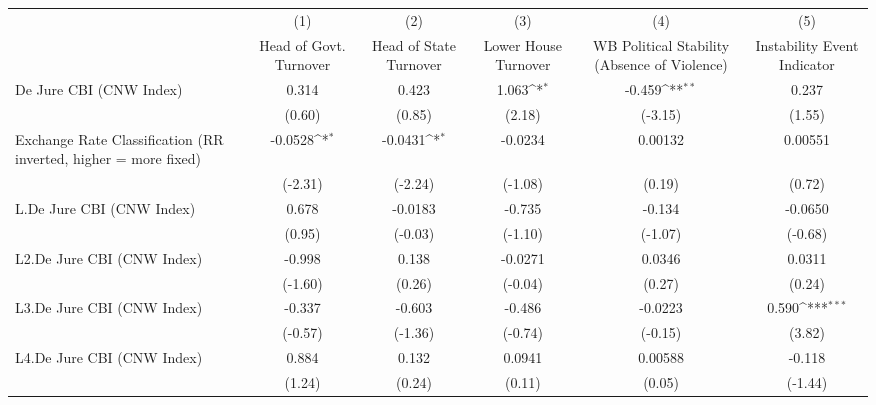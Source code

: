 {
\def\sym#1{\ifmmode^{#1}\else\(^{#1}\)\fi}
\begin{longtable}{l*{5}{c}}
\toprule\endfirsthead\midrule\endhead\midrule\endfoot\endlastfoot
                &\multicolumn{1}{c}{(1)}&\multicolumn{1}{c}{(2)}&\multicolumn{1}{c}{(3)}&\multicolumn{1}{c}{(4)}&\multicolumn{1}{c}{(5)}\\
                &\multicolumn{1}{c}{Head of Govt. Turnover}&\multicolumn{1}{c}{Head of State Turnover}&\multicolumn{1}{c}{Lower House Turnover}&\multicolumn{1}{c}{WB Political Stability (Absence of Violence)}&\multicolumn{1}{c}{Instability Event Indicator}\\
\midrule
De Jure CBI (CNW Index)&    0.314         &    0.423         &    1.063\sym{*}  &   -0.459\sym{**} &    0.237         \\
                &   (0.60)         &   (0.85)         &   (2.18)         &  (-3.15)         &   (1.55)         \\
\addlinespace
Exchange Rate Classification (RR inverted, higher = more fixed)&  -0.0528\sym{*}  &  -0.0431\sym{*}  &  -0.0234         &  0.00132         &  0.00551         \\
                &  (-2.31)         &  (-2.24)         &  (-1.08)         &   (0.19)         &   (0.72)         \\
\addlinespace
L.De Jure CBI (CNW Index)&    0.678         &  -0.0183         &   -0.735         &   -0.134         &  -0.0650         \\
                &   (0.95)         &  (-0.03)         &  (-1.10)         &  (-1.07)         &  (-0.68)         \\
\addlinespace
L2.De Jure CBI (CNW Index)&   -0.998         &    0.138         &  -0.0271         &   0.0346         &   0.0311         \\
                &  (-1.60)         &   (0.26)         &  (-0.04)         &   (0.27)         &   (0.24)         \\
\addlinespace
L3.De Jure CBI (CNW Index)&   -0.337         &   -0.603         &   -0.486         &  -0.0223         &    0.590\sym{***}\\
                &  (-0.57)         &  (-1.36)         &  (-0.74)         &  (-0.15)         &   (3.82)         \\
\addlinespace
L4.De Jure CBI (CNW Index)&    0.884         &    0.132         &   0.0941         &  0.00588         &   -0.118         \\
                &   (1.24)         &   (0.24)         &   (0.11)         &   (0.05)         &  (-1.44)         \\

\end{longtable}}
